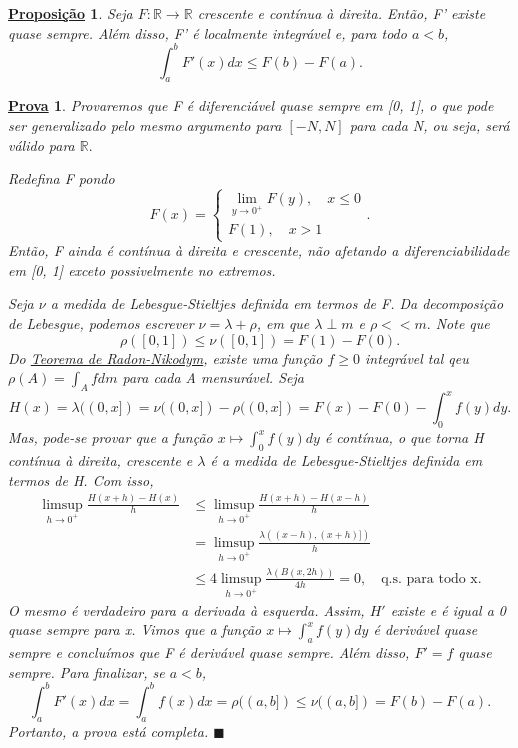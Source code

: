 \documentclass{article}
\newtheorem*{prop*}{\underline{Proposi\c c\~ao}}
\newtheorem*{proof*}{\underline{Prova}}
\renewcommand\qedsymbol{$\blacksquare$}
\begin{document}
\begin{prop*}
  Seja \(F:\mathbb{R}\rightarrow \mathbb{R}\) crescente e contínua à direita. Então, F' existe quase sempre. Além disso, F' é localmente integrável e, para todo \(a< b\), 
    \[
      \int_{a}^{b}F'(x)dx \leq F(b) - F(a).
    \]
\end{prop*}
\begin{proof*}
  Provaremos que F é diferenciável quase sempre em [0, 1], o que pode ser generalizado pelo mesmo argumento para \([-N, N]\) para cada N, ou seja, será válido para \(\mathbb{R}.\)

  Redefina F pondo 
    \[
      F(x) = \left\{\begin{array}{ll}
          \lim_{y\to 0^{+}}F(y),\quad x \leq 0\\ 
          F(1),\quad x > 1
        \end{array}\right..
    \]
  Então, F ainda é contínua à direita e crescente, não afetando a diferenciabilidade em [0, 1] exceto possivelmente no extremos. 

  Seja \(\nu \) a medida de Lebesgue-Stieltjes definida em termos de F. Da decomposição de Lebesgue, podemos escrever \(\nu = \lambda +\rho \), em que \(\lambda \perp m\) e \(\rho << m.\) Note que 
    \[
      \rho ([0, 1]) \leq \nu ([0,1]) = F(1) - F(0).
    \]
  Do \hyperlink{radon_nikodym}{Teorema de Radon-Nikodym}, existe uma função \(f\geq 0\) integrável tal qeu \(\rho (A) = \int_{A}^{}fdm\) para cada A mensurável. Seja 
    \[
      H(x) = \lambda ((0, x]) = \nu ((0, x]) - \rho ((0, x]) = F(x) - F(0) - \int_{0}^{x}f(y)dy.
    \]
  Mas, pode-se provar que a função \(x\mapsto \int_{0}^{x}f(y)dy\) é contínua, o que torna H contínua à direita, crescente e \(\lambda \) é a medida de Lebesgue-Stieltjes definida em termos de H. Com isso, 
 \begin{align*}
   \limsup_{h\to 0^{+}}\frac{H(x+h) - H(x)}{h} &\leq \limsup_{h\to 0^{+}}\frac{H(x+h) - H(x-h)}{h}\\ 
                                               &=\limsup_{h\to 0^{+}}\frac{\lambda ((x-h), (x+h)])}{h}\\ 
                                               &\leq 4\limsup_{h\to 0^{+}}\frac{\lambda (B(x, 2h))}{4h} = 0,\quad \text{q.s. para todo x.}
 \end{align*}
 O mesmo é verdadeiro para a derivada à esquerda. Assim, \(H'\) existe e é igual a 0 quase sempre para x. Vimos que a função \(x\mapsto \int_{a}^{x}f(y)dy\) é derivável quase sempre e concluímos que F é derivável quase sempre. Além disso, \(F'=f\) quase sempre. Para finalizar, se 
 \(a < b\), 
   \[
     \int_{a}^{b}F'(x)dx = \int_{a}^{b}f(x)dx = \rho ((a, b])\leq \nu ((a, b]) = F(b) - F(a).
   \]
   Portanto, a prova está completa. \qedsymbol
\end{proof*}
\end{document}
